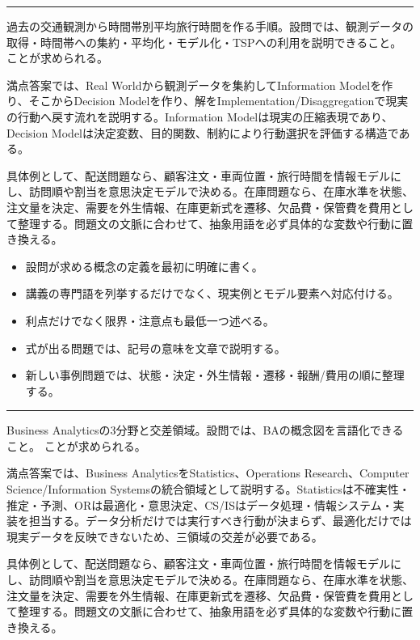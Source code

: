 \vspace{2mm}\hrule\vspace{2mm}
過去の交通観測から時間帯別平均旅行時間を作る手順。設問では、観測データの取得・時間帯への集約・平均化・モデル化・TSPへの利用を説明できること。 ことが求められる。\par
{}
満点答案では、Real Worldから観測データを集約してInformation Modelを作り、そこからDecision Modelを作り、解をImplementation/Disaggregationで現実の行動へ戻す流れを説明する。Information Modelは現実の圧縮表現であり、Decision Modelは決定変数、目的関数、制約により行動選択を評価する構造である。\par
{}
具体例として、配送問題なら、顧客注文・車両位置・旅行時間を情報モデルにし、訪問順や割当を意思決定モデルで決める。在庫問題なら、在庫水準を状態、注文量を決定、需要を外生情報、在庫更新式を遷移、欠品費・保管費を費用として整理する。問題文の文脈に合わせて、抽象用語を必ず具体的な変数や行動に置き換える。\par
{}
\begin{itemize}
\item 設問が求める概念の定義を最初に明確に書く。
\item 講義の専門語を列挙するだけでなく、現実例とモデル要素へ対応付ける。
\item 利点だけでなく限界・注意点も最低一つ述べる。
\item 式が出る問題では、記号の意味を文章で説明する。
\item 新しい事例問題では、状態・決定・外生情報・遷移・報酬/費用の順に整理する。
\end{itemize}
\vspace{2mm}\hrule\vspace{2mm}
Business Analyticsの3分野と交差領域。設問では、BAの概念図を言語化できること。 ことが求められる。\par
{}
満点答案では、Business AnalyticsをStatistics、Operations Research、Computer Science/Information Systemsの統合領域として説明する。Statisticsは不確実性・推定・予測、ORは最適化・意思決定、CS/ISはデータ処理・情報システム・実装を担当する。データ分析だけでは実行すべき行動が決まらず、最適化だけでは現実データを反映できないため、三領域の交差が必要である。\par
{}
具体例として、配送問題なら、顧客注文・車両位置・旅行時間を情報モデルにし、訪問順や割当を意思決定モデルで決める。在庫問題なら、在庫水準を状態、注文量を決定、需要を外生情報、在庫更新式を遷移、欠品費・保管費を費用として整理する。問題文の文脈に合わせて、抽象用語を必ず具体的な変数や行動に置き換える。\par
